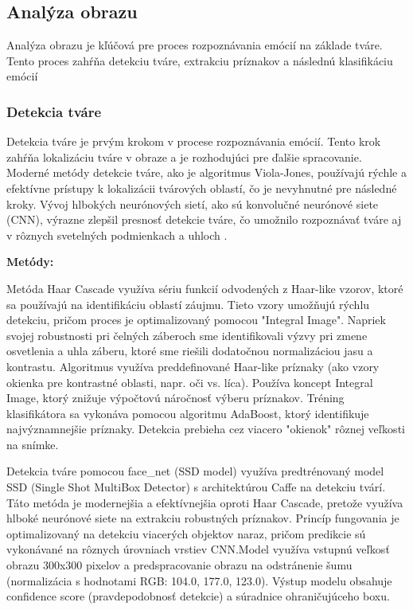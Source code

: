 \subsection{Analýza obrazu}
Analýza obrazu je kľúčová pre proces rozpoznávania emócií na základe tváre. Tento proces zahŕňa detekciu tváre, extrakciu príznakov a následnú klasifikáciu emócií​
\subsubsection{Detekcia tváre}
Detekcia tváre je prvým krokom v procese rozpoznávania emócií. Tento krok zahŕňa lokalizáciu tváre v obraze a je rozhodujúci pre ďalšie spracovanie. Moderné metódy detekcie tváre, ako je algoritmus Viola-Jones,
 používajú rýchle a efektívne prístupy k lokalizácii tvárových oblastí, čo je nevyhnutné pre následné kroky​. Vývoj hlbokých neurónových sietí, ako sú konvolučné neurónové siete (CNN), výrazne zlepšil presnosť 
 detekcie tváre, čo umožnilo rozpoznávať tváre aj v rôznych svetelných podmienkach a uhloch​ \cite{article03}.

\textbf{Metódy:}

Metóda Haar Cascade využíva sériu funkcií odvodených z Haar-like vzorov, ktoré sa používajú na identifikáciu oblastí záujmu. Tieto vzory umožňujú rýchlu detekciu, pričom proces je optimalizovaný pomocou 
"Integral Image". Napriek svojej robustnosti pri čelných záberoch sme identifikovali výzvy pri zmene osvetlenia a uhla záberu, ktoré sme riešili dodatočnou normalizáciou jasu a kontrastu.
Algoritmus využíva preddefinované Haar-like príznaky (ako vzory okienka pre kontrastné oblasti, napr. oči vs. líca). Používa koncept Integral Image, ktorý znižuje výpočtovú náročnosť výberu príznakov. 
Tréning klasifikátora sa vykonáva pomocou algoritmu AdaBoost, ktorý identifikuje najvýznamnejšie príznaky. Detekcia prebieha cez viacero "okienok" rôznej veľkosti na snímke.

Detekcia tváre pomocou face\_net (SSD model) využíva predtrénovaný model SSD (Single Shot MultiBox Detector) s architektúrou Caffe na detekciu tvárí. Táto metóda je modernejšia a 
efektívnejšia oproti Haar Cascade, pretože využíva hlboké neurónové siete na extrakciu robustných príznakov.
Princíp fungovania je optimalizovaný na detekciu viacerých objektov naraz, pričom predikcie sú vykonávané na rôznych úrovniach vrstiev CNN.Model využíva vstupnú veľkosť obrazu 300x300 pixelov a 
predspracovanie obrazu na odstránenie šumu (normalizácia s hodnotami RGB: 104.0, 177.0, 123.0). Výstup modelu obsahuje confidence score (pravdepodobnosť detekcie) a súradnice ohraničujúceho boxu.

